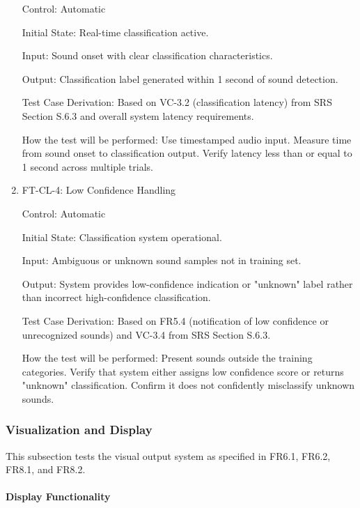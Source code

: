 \documentclass[12pt, titlepage]{article}
\begin{document}
\begin{enumerate}
Control: Automatic
					
Initial State: Real-time classification active.
					
Input: Sound onset with clear classification characteristics.
					
Output: Classification label generated within 1 second of sound detection.

Test Case Derivation: Based on VC-3.2 (classification latency) from SRS Section
S.6.3 and overall system latency requirements.

How the test will be performed: Use timestamped audio input. Measure time from sound
onset to classification output. Verify latency less than or equal to 1 second 
across multiple trials.

\item{FT-CL-4: Low Confidence Handling\\}

Control: Automatic
					
Initial State: Classification system operational.
					
Input: Ambiguous or unknown sound samples not in training set.
					
Output: System provides low-confidence indication or "unknown" label rather than
incorrect high-confidence classification.

Test Case Derivation: Based on FR5.4 (notification of low confidence or
unrecognized sounds) and VC-3.4 from SRS Section S.6.3.

How the test will be performed: Present sounds outside the training categories.
Verify that system either assigns low confidence score or returns "unknown"
classification. Confirm it does not confidently misclassify unknown sounds.

\end{enumerate}

\subsubsection{Visualization and Display}

This subsection tests the visual output system as specified in FR6.1, FR6.2,
FR8.1, and FR8.2.

\paragraph{Display Functionality}
\end{document}
